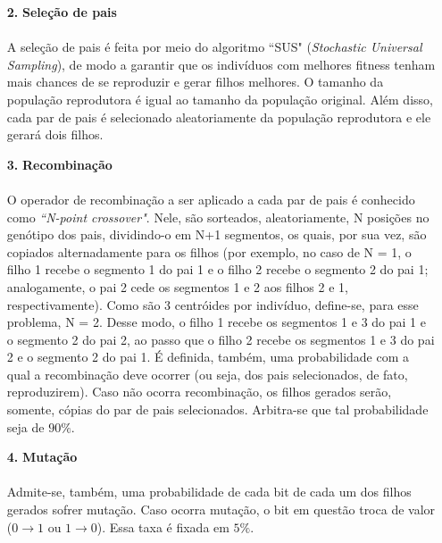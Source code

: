 \documentclass{report}
\begin{document}
\begin{itemize}
	\item[\textbf{2.}] \textbf{Seleção de pais}
	
	\paragraph{} A seleção de pais é feita por meio do algoritmo ``SUS" (\textit{Stochastic Universal Sampling}), de modo a garantir que os indivíduos com melhores fitness tenham mais chances de se reproduzir e gerar filhos melhores. O tamanho da população reprodutora é igual ao tamanho da população original. Além disso, cada par de pais é selecionado aleatoriamente da população reprodutora e ele gerará dois filhos.\\
	
	\item[\textbf{3.}] \textbf{Recombinação}
	
	\paragraph{} O operador de recombinação a ser aplicado a cada par de pais é conhecido como \textit{``N-point crossover"}. Nele, são sorteados, aleatoriamente, N posições no genótipo dos pais, dividindo-o em N+1 segmentos, os quais, por sua vez, são copiados alternadamente para os filhos (por exemplo, no caso de N = 1, o filho 1 recebe o segmento 1 do pai 1 e o filho 2 recebe o segmento 2 do pai 1; analogamente, o pai 2 cede os segmentos 1 e 2 aos filhos 2 e 1, respectivamente). Como são 3 centróides por indivíduo, define-se, para esse problema, N = 2. Desse modo, o filho 1 recebe os segmentos 1 e 3 do pai 1 e o segmento 2 do pai 2, ao passo que o filho 2 recebe os segmentos 1 e 3 do pai 2 e o segmento 2 do pai 1. É definida, também, uma probabilidade com a qual a recombinação deve ocorrer (ou seja, dos pais selecionados, de fato, reproduzirem). Caso não ocorra recombinação, os filhos gerados serão, somente, cópias do par de pais selecionados. Arbitra-se que tal probabilidade seja de $90\%$.\\
	
	\item[\textbf{4.}] \textbf{Mutação}
	
	\paragraph{} Admite-se, também, uma probabilidade de cada bit de cada um dos filhos gerados sofrer mutação. Caso ocorra mutação, o bit em questão troca de valor ($0 \rightarrow 1$ ou $1 \rightarrow 0$). Essa taxa é fixada em $5\%$.\\
	

\end{itemize}
\end{document}
